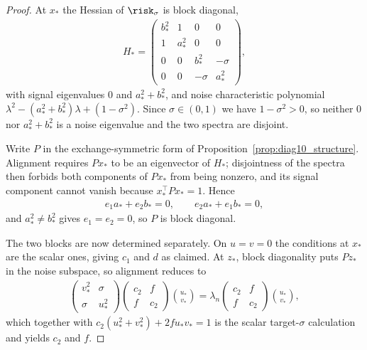 \documentclass{article}
\begin{document}
\begin{proof}
At $x_*$ the Hessian of $\risk_\sigma$ is block diagonal,
\begin{align}
    H_*=
    \begin{pmatrix}
        b_*^2 & 1 & 0 & 0\\
        1 & a_*^2 & 0 & 0\\
        0 & 0 & b_*^2 & -\sigma\\
        0 & 0 & -\sigma & a_*^2
    \end{pmatrix},
\end{align}
with signal eigenvalues $0$ and $a_*^2+b_*^2$, and noise characteristic
polynomial $\lambda^2-(a_*^2+b_*^2)\lambda+(1-\sigma^2)$. Since
$\sigma\in(0,1)$ we have $1-\sigma^2>0$, so neither $0$ nor $a_*^2+b_*^2$ is a
noise eigenvalue and the two spectra are disjoint.

Write $P$ in the exchange-symmetric form of
Proposition~\ref{prop:diag10_structure}. Alignment requires $Px_*$ to be an
eigenvector of $H_*$; disjointness of the spectra then forbids both components
of $Px_*$ from being nonzero, and its signal component cannot vanish because
$x_*^\top Px_*=1$. Hence
\begin{align}
    e_1a_*+e_2b_*=0,
    \qquad
    e_2a_*+e_1b_*=0,
\end{align}
and $a_*^2\ne b_*^2$ gives $e_1=e_2=0$, so $P$ is block diagonal.

The two blocks are now determined separately. On $u=v=0$ the conditions at
$x_*$ are the scalar ones, giving $c_1$ and $d$ as claimed. At $z_*$, block
diagonality puts $Pz_*$ in the noise subspace, so alignment reduces to
\begin{align}
    \begin{pmatrix}
        v_*^2 & \sigma\\
        \sigma & u_*^2
    \end{pmatrix}
    \begin{pmatrix}
        c_2 & f\\
        f & c_2
    \end{pmatrix}
    \binom{u_*}{v_*}
    =
    \lambda_n
    \begin{pmatrix}
        c_2 & f\\
        f & c_2
    \end{pmatrix}
    \binom{u_*}{v_*},
\end{align}
which together with $c_2(u_*^2+v_*^2)+2fu_*v_*=1$ is the scalar target-$\sigma$
calculation and yields $c_2$ and $f$.
\end{proof}
\end{document}
